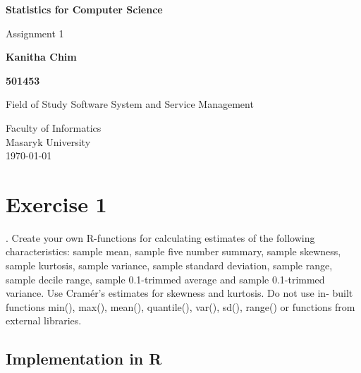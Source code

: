 \documentclass[12pt, oneside]{report}\usepackage[]{graphicx}\usepackage[]{color}
\begin{document}
\begin{titlepage}
    \begin{center}
        \vspace*{1cm}
        
        \Huge
          \textbf{Statistics for Computer Science} %
        
        \vspace{0.5cm}
        \LARGE
        Assignment 1 %
        
        \vspace{1.5cm}
        
        \textbf{Kanitha Chim} %
   		  \vspace{1.5cm}
        
        \textbf{501453} %
       
        \vfill
        
        Field of Study Software System and Service Management %
        
        \vspace{0.8cm}
          \Large
        Faculty of Informatics\\
        Masaryk University\\
        \vspace{0.5cm}
       \today
        
    \end{center}
\end{titlepage}


\section*{Exercise 1}
. Create your own R-functions for calculating estimates of the following characteristics: sample
mean, sample five number summary, sample skewness, sample kurtosis, sample variance, sample
standard deviation, sample range, sample decile range, sample 0.1-trimmed average and sample
0.1-trimmed variance. Use Cramér’s estimates for skewness and kurtosis. Do not use in-
built functions min(), max(), mean(), quantile(), var(), sd(), range() or functions from external
libraries.

\subsection*{Implementation in R}
\end{document}
